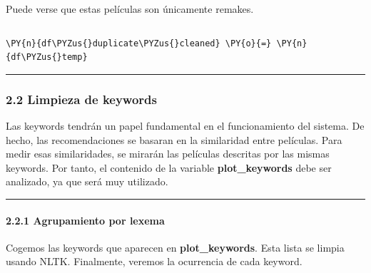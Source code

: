     Puede verse que estas películas son únicamente remakes.

    \begin{tcolorbox}[breakable, size=fbox, boxrule=1pt, pad at break*=1mm,colback=cellbackground, colframe=cellborder]
\begin{Verbatim}[commandchars=\\\{\}]

\end{Verbatim}
\end{tcolorbox}

    \begin{tcolorbox}[breakable, size=fbox, boxrule=1pt, pad at break*=1mm,colback=cellbackground, colframe=cellborder]
\begin{Verbatim}[commandchars=\\\{\}]
\PY{n}{df\PYZus{}duplicate\PYZus{}cleaned} \PY{o}{=} \PY{n}{df\PYZus{}temp}
\end{Verbatim}
\end{tcolorbox}

    \begin{center}\rule{0.5\linewidth}{\linethickness}\end{center}

\subsubsection{2.2 Limpieza de keywords}\label{limpieza-de-keywords}

Las keywords tendrán un papel fundamental en el funcionamiento del
sistema. De hecho, las recomendaciones se basaran en la similaridad
entre películas. Para medir esas similaridades, se mirarán las películas
descritas por las mismas keywords. Por tanto, el contenido de la
variable \textbf{plot\_keywords} debe ser analizado, ya que será muy
utilizado.

    \begin{center}\rule{0.5\linewidth}{\linethickness}\end{center}

\paragraph{2.2.1 Agrupamiento por lexema}\label{agrupamiento-por-lexema}

Cogemos las keywords que aparecen en \textbf{plot\_keywords}. Esta lista
se limpia usando NLTK. Finalmente, veremos la ocurrencia de cada
keyword.

